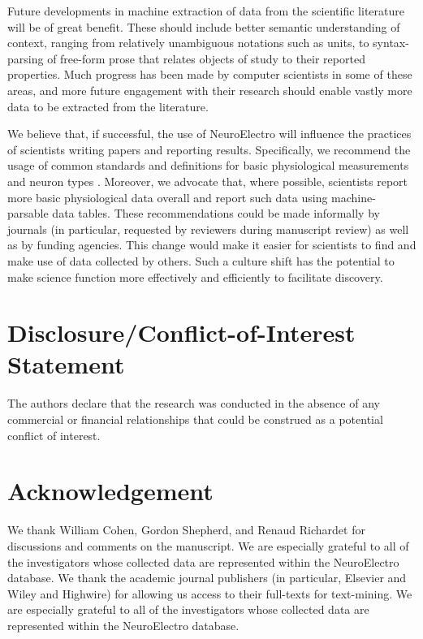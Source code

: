 \documentclass{template/frontiersSCNS} %
\begin{document}
Future developments in machine extraction of data from the scientific literature will be of great benefit.  
These should include better semantic understanding of context, ranging from relatively unambiguous notations such as units, to syntax-parsing of free-form prose that relates objects of study to their reported properties.  
Much progress has been made by computer scientists in some of these areas, and more future engagement with their research should enable vastly more data to be extracted from the literature.  

We believe that, if successful, the use of NeuroElectro will influence the practices of scientists writing papers and reporting results.  
Specifically, we recommend the usage of common standards and definitions for basic physiological measurements \citep{toledo-rodriguez_correlation_2004} and neuron types \citep{ascoli_petilla_2008,larson_neurolex.org:_2013}.  
Moreover, we advocate that, where possible, scientists report more basic physiological data overall and report such data using machine-parsable data tables.  
These recommendations could be made informally by journals (in particular, requested by reviewers during manuscript review) as well as by funding agencies.
This change would make it easier for scientists to find and make use of data collected by others.  
Such a culture shift has the potential to make science function more effectively and efficiently to facilitate discovery.   

\section*{Disclosure/Conflict-of-Interest Statement}
The authors declare that the research was conducted in the absence of any commercial or financial relationships that could be construed as a potential conflict of interest.

\section*{Acknowledgement}
We thank William Cohen, Gordon Shepherd, and Renaud Richardet for discussions and comments on the manuscript. 
We are especially grateful to all of the investigators whose collected data are represented within the NeuroElectro database.  
We thank the academic journal publishers (in particular, Elsevier and Wiley and Highwire) for allowing us access to their full-texts for text-mining.  
We are especially grateful to all of the investigators whose collected data are represented within the NeuroElectro database.
\end{document}
